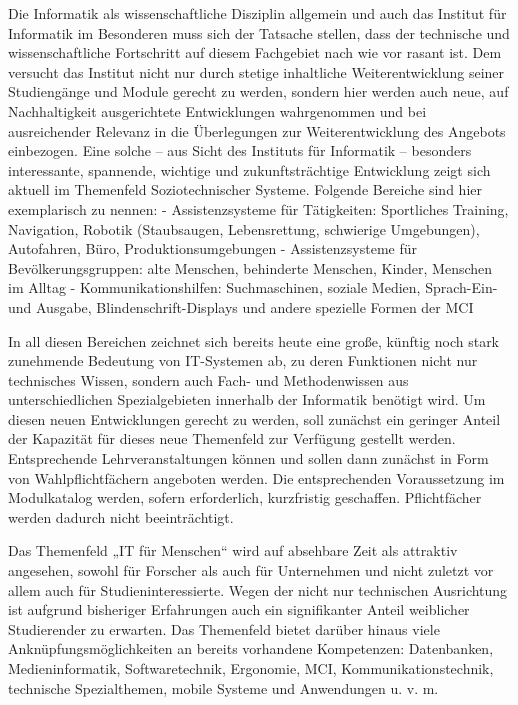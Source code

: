 \begin{siderules}
Die Informatik als wissenschaftliche Disziplin allgemein und auch das
Institut für Informatik im Besonderen muss sich der Tatsache stellen,
dass der technische und wissenschaftliche Fortschritt auf diesem
Fachgebiet nach wie vor rasant ist. Dem versucht das Institut nicht nur
durch stetige inhaltliche Weiterentwicklung seiner Studiengänge und
Module gerecht zu werden, sondern hier werden auch neue, auf
Nachhaltigkeit ausgerichtete Entwicklungen wahrgenommen und bei
ausreichender Relevanz in die Überlegungen zur Weiterentwicklung des
Angebots einbezogen. Eine solche -- aus Sicht des Instituts für
Informatik -- besonders interessante, spannende, wichtige und
zukunftsträchtige Entwicklung zeigt sich aktuell im Themenfeld
Soziotechnischer Systeme. Folgende Bereiche sind hier exemplarisch zu
nennen: - Assistenzsysteme für Tätigkeiten: Sportliches Training,
Navigation, Robotik (Staubsaugen, Lebensrettung, schwierige Umgebungen),
Autofahren, Büro, Produktionsumgebungen - Assistenzsysteme für
Bevölkerungsgruppen: alte Menschen, behinderte Menschen, Kinder,
Menschen im Alltag - Kommunikationshilfen: Suchmaschinen, soziale
Medien, Sprach-Ein- und Ausgabe, Blindenschrift-Displays und andere
spezielle Formen der MCI

In all diesen Bereichen zeichnet sich bereits heute eine große, künftig
noch stark zunehmende Bedeutung von IT-Systemen ab, zu deren Funktionen
nicht nur technisches Wissen, sondern auch Fach- und Methodenwissen aus
unterschiedlichen Spezialgebieten innerhalb der Informatik benötigt
wird. Um diesen neuen Entwicklungen gerecht zu werden, soll zunächst ein
geringer Anteil der Kapazität für dieses neue Themenfeld zur Verfügung
gestellt werden. Entsprechende Lehrveranstaltungen können und sollen
dann zunächst in Form von Wahlpflichtfächern angeboten werden. Die
entsprechenden Voraussetzung im Modulkatalog werden, sofern
erforderlich, kurzfristig geschaffen. Pflichtfächer werden dadurch nicht
beeinträchtigt.

Das Themenfeld „IT für Menschen`` wird auf absehbare Zeit als attraktiv
angesehen, sowohl für Forscher als auch für Unternehmen und nicht
zuletzt vor allem auch für Studieninteressierte. Wegen der nicht nur
technischen Ausrichtung ist aufgrund bisheriger Erfahrungen auch ein
signifikanter Anteil weiblicher Studierender zu erwarten. Das Themenfeld
bietet darüber hinaus viele Anknüpfungsmöglichkeiten an bereits
vorhandene Kompetenzen: Datenbanken, Medieninformatik, Softwaretechnik,
Ergonomie, MCI, Kommunikationstechnik, technische Spezialthemen, mobile
Systeme und Anwendungen u. v. m.


\end{siderules}
